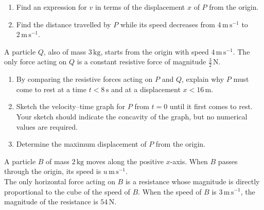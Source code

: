 \documentclass[leqno]{article}
\begin{document}
\begin{enumerate}[
  label=\textbf{\arabic*.},
  leftmargin=*,
  topsep=0pt,
  partopsep=0pt,
  parsep=0pt
]
\begin{enumerate}[label=\textbf{(\alph*)}]
  \item Find an expression for $v$ in terms of the displacement $x$ of $P$ from the origin.  \\
  \item Find the distance travelled by $P$ while its speed decreases from $4\,\mathrm{m\,s^{-1}}$ to $2\,\mathrm{m\,s^{-1}}$.  \\
\end{enumerate}
A particle $Q$, also of mass $3\,\mathrm{kg}$, starts from the origin with speed $4\,\mathrm{m\,s^{-1}}$. The only force acting on $Q$ is a constant resistive force of magnitude $\frac{3}{2}\,\mathrm{N}$. \\
\begin{enumerate}[label=\textbf{(\alph*)}, resume]
  \item By comparing the resistive forces acting on $P$ and $Q$, explain why $P$ must come to rest at a time $t<8\,\mathrm{s}$ and at a displacement $x<16\,\mathrm{m}$.  \\
  \item Sketch the velocity--time graph for $P$ from $t=0$ until it first comes to rest. Your sketch should indicate the concavity of the graph, but no numerical values are required.  \\
  \item Determine the maximum displacement of $P$ from the origin.  \\
\end{enumerate}

\newpage

\questionitem

A particle $B$ of mass $2\,\mathrm{kg}$ moves along the positive $x$-axis. When $B$ passes through the origin, its speed is $u\,\mathrm{m\,s^{-1}}$. \\

The only horizontal force acting on $B$ is a resistance whose magnitude is directly proportional to the cube of the speed of $B$. When the speed of $B$ is $3\,\mathrm{m\,s^{-1}}$, the magnitude of the resistance is $54\,\mathrm{N}$. \\


\end{enumerate}
\end{document}
